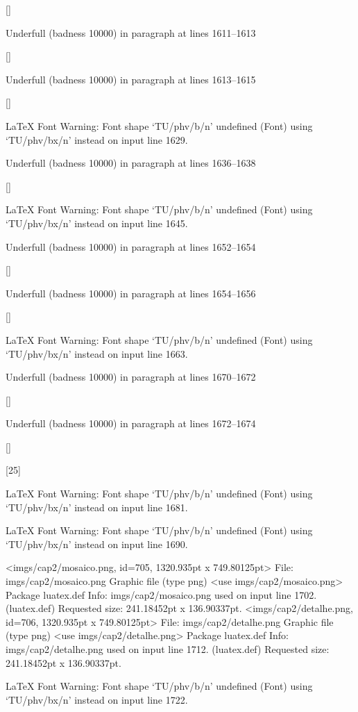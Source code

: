  []


Underfull \hbox (badness 10000) in paragraph at lines 1611--1613

 []


Underfull \hbox (badness 10000) in paragraph at lines 1613--1615

 []


LaTeX Font Warning: Font shape `TU/phv/b/n' undefined
(Font)              using `TU/phv/bx/n' instead on input line 1629.


Underfull \hbox (badness 10000) in paragraph at lines 1636--1638

 []


LaTeX Font Warning: Font shape `TU/phv/b/n' undefined
(Font)              using `TU/phv/bx/n' instead on input line 1645.


Underfull \hbox (badness 10000) in paragraph at lines 1652--1654

 []


Underfull \hbox (badness 10000) in paragraph at lines 1654--1656

 []


LaTeX Font Warning: Font shape `TU/phv/b/n' undefined
(Font)              using `TU/phv/bx/n' instead on input line 1663.


Underfull \hbox (badness 10000) in paragraph at lines 1670--1672

 []


Underfull \hbox (badness 10000) in paragraph at lines 1672--1674

 []

[25]

LaTeX Font Warning: Font shape `TU/phv/b/n' undefined
(Font)              using `TU/phv/bx/n' instead on input line 1681.


LaTeX Font Warning: Font shape `TU/phv/b/n' undefined
(Font)              using `TU/phv/bx/n' instead on input line 1690.

<imgs/cap2/mosaico.png, id=705, 1320.935pt x 749.80125pt>
File: imgs/cap2/mosaico.png Graphic file (type png)
<use imgs/cap2/mosaico.png>
Package luatex.def Info: imgs/cap2/mosaico.png  used on input line 1702.
(luatex.def)             Requested size: 241.18452pt x 136.90337pt.
<imgs/cap2/detalhe.png, id=706, 1320.935pt x 749.80125pt>
File: imgs/cap2/detalhe.png Graphic file (type png)
<use imgs/cap2/detalhe.png>
Package luatex.def Info: imgs/cap2/detalhe.png  used on input line 1712.
(luatex.def)             Requested size: 241.18452pt x 136.90337pt.

LaTeX Font Warning: Font shape `TU/phv/b/n' undefined
(Font)              using `TU/phv/bx/n' instead on input line 1722.


